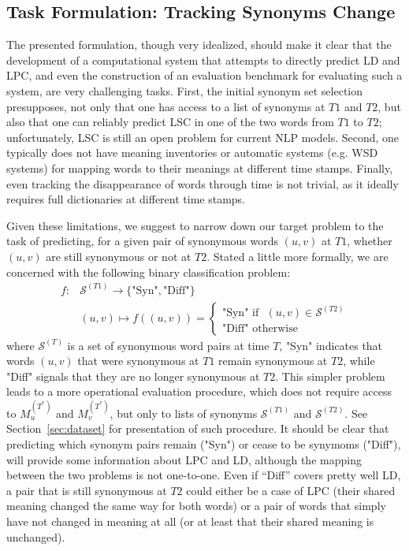 \documentclass[11pt]{article}
\newcommand{\synonymsSet}{\mathcal{S}}
\begin{document}
 \subsection{Task Formulation: Tracking Synonyms Change}
\label{sec:classif}

The presented formulation, though very idealized, should make it clear that the development of a computational system that attempts to directly predict LD and LPC, and even the construction of an evaluation benchmark for evaluating such a system, are very challenging tasks. First, the initial synonym set selection presupposes, not only that one has access to a list of synonyms at $T1$ and $T2$, but also that one can reliably predict LSC in one of the two words from $T1$ to $T2$; unfortunately, LSC is still an open problem for current NLP models. Second, one typically does not have meaning inventories or automatic systems (e.g. WSD systems) for mapping words to their meanings at different time stamps. Finally, even tracking the disappearance of words through time is not trivial, as it ideally requires full dictionaries at different time stamps. 

Given these limitations, we suggest to narrow down our target problem to the task of predicting, for a given pair of synonymous words $(u,v)$ at $T1$, whether $(u,v)$ are still synonymous or not at $T2$. Stated a little more formally, we are concerned with the following binary classification problem:
\begin{align*}   
    f: & \synonymsSet^{(T1)} \rightarrow \{\text{"Syn"},\text{"Diff"}\} \\
       & (u,v)              \mapsto f( (u,v) ) = \begin{cases} \text{"Syn"~if~ $(u,v)\in\synonymsSet^{(T2)}$} \\  \text{"Diff"~otherwise} \end{cases}   
\end{align*}
where $\synonymsSet^{(T)}$ is a set of synonymous word pairs at time $T$, "Syn" indicates that words $(u,v)$ that were synonymous at $T1$ remain synonymous at $T2$, while "Diff" signals that they are no longer synonymous at $T2$. This simpler problem leads to a more operational evaluation procedure, which does not require access to $M_u^{(T^*)}$ and $M_v^{(T^*)}$, but only to lists of synonyms $\synonymsSet^{(T1)}$ and $\synonymsSet^{(T2)}$. See Section~\ref{sec:dataset} for presentation of such procedure. It should be clear that predicting which synonym pairs remain ("Syn") or cease to be synymoms ("Diff"), will provide some information about LPC and LD, although the mapping between the two problems is not one-to-one. Even if ``Diff'' covers pretty well LD, a pair that is still synonymous at $T2$ could either be a case of LPC (their shared meaning changed the same way for both words) or a pair of words that simply have not changed in meaning at all (or at least that their shared meaning is unchanged).
\end{document}
